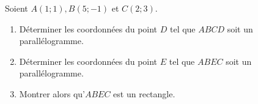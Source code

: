 
%
Soient $A\left(1 ; 1\right), B\left(5 ; -1\right)$ et $C\left(2 ; 3\right)$.
\begin{enumerate}
     \item
     Déterminer les coordonnées du point $D$ tel que $ABCD$ soit un parallélogramme.
     \item
     Déterminer les coordonnées du point $E$ tel que $ABEC$ soit un parallélogramme.
     \item
     Montrer alors qu'$ABEC$ est un rectangle.
\end{enumerate}
\begin{corrige}

     \par
{}%
\end{corrige}

